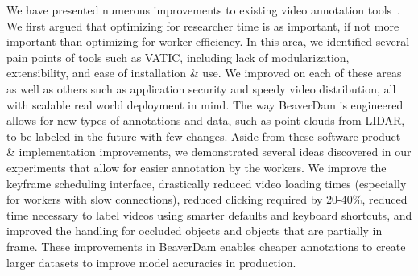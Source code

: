 We have presented numerous improvements to existing video annotation tools~\cite{Vatic}.
We first argued that optimizing for researcher time is as important, if not more important than optimizing for worker efficiency.
In this area, we identified several pain points of tools such as VATIC, including lack of modularization, extensibility, and ease of installation \& use.
We improved on each of these areas as well as others such as application security and speedy video distribution, all with scalable real world deployment in mind.
The way BeaverDam is engineered allows for new types of annotations and data, such as point clouds from LIDAR, to be labeled in the future with few changes.
Aside from these software product \& implementation improvements, we demonstrated several ideas discovered in our experiments that allow for easier annotation by the workers.
We improve the keyframe scheduling interface, drastically reduced video loading times (especially for workers with slow connections), reduced clicking required by 20-40\%, reduced time necessary to label videos using smarter defaults and keyboard shortcuts, and improved the handling for occluded objects and objects that are partially in frame.
These improvements in BeaverDam enables cheaper annotations to create larger datasets to improve model accuracies in production.
